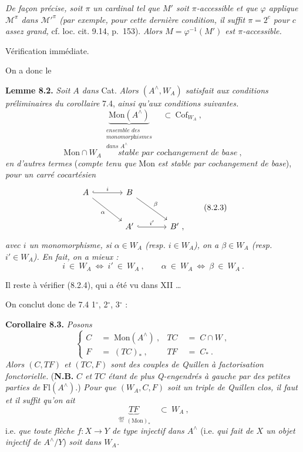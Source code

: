 \documentclass[11pt]{article}
\newcommand{\printedpage}[1]{\marginpar{\footnotesize p.~#1}}
\newcommand{\msp}[1]{\marginpar{\footnotesize [#1]}}
\newcommand{\Mon}{\mathrm{Mon}}
\newcommand{\Fl}{\mathrm{Fl}}
\newcommand{\Cof}{\mathrm{Cof}}
\newcommand{\chap}{^{\wedge}}
\begin{document}
\msp{page 103}
\textit{De façon précise, soit $\pi$ un cardinal tel que $M'$ soit $\pi$-accessible et que $\varphi$ applique $\mathcal{M}^{\pi}$ dans $\mathcal{M}'^{\pi}$ (par exemple, pour cette dernière condition, il suffit $\pi=2^c$ pour $c$ assez grand,} cf. loc. cit. 9.14, p.~153). \textit{Alors $M=\varphi^{-1}(M')$ est $\pi$-accessible.}

Vérification immédiate.

On a donc le

\printedpage{57}
\textbf{Lemme 8.2.} \textit{Soit $A$ dans} Cat. \textit{Alors $(A\chap,W_A)$ satisfait aux conditions préliminaires du corollaire} 7.4, \textit{ainsi qu'aux conditions suivantes.}
\[
\underbrace{\Mon(A\chap)}_{\substack{\textit{ensemble des}\\ \textit{monomorphismes}\\ \textit{dans } A\chap}} \quad\subset\ \Cof_{W_A}\ ,
\tag*{(8.2.1)}
\]
\[
\Mon\cap W_A \qquad \textit{stable par cochangement de base}\ ,
\tag*{(8.2.2)}
\]
\textit{en d'autres termes} (\textit{compte tenu que} Mon \textit{est stable par cochangement de base}), \textit{pour un carré cocartésien}
\[
\begin{tikzcd}[row sep=large, column sep=large]
A \arrow[r, hook, "i"] \arrow[dr, "\alpha"'] & B \arrow[dr, "\beta"] & \\
& A' \arrow[r, hook, "i'"] & B'\ ,
\end{tikzcd}
\tag*{(8.2.3)}
\]
\textit{avec $i$ un monomorphisme, si $\alpha\in W_A$ (resp. $i\in W_A$), on a $\beta\in W_A$ (resp. $i'\in W_A$). En fait, on a mieux :}
\[
i\ \in\ W_A \ \Longleftrightarrow\ i'\ \in\ W_A\ , \qquad \alpha\ \in\ W_A \ \Longleftrightarrow\ \beta\ \in\ W_A\ .
\tag*{(8.2.4)}
\]

\msp{page 104}
Il reste à vérifier (8.2.4), qui a été vu dans XII \ldots

On conclut donc de 7.4 1$^\circ$, 2$^\circ$, 3$^\circ$ :

\textbf{Corollaire 8.3.} \textit{Posons}
\[
\left\{
\begin{aligned}
C \;&=\; \Mon(A\chap)\ , & TC \;&=\; C\cap W\ ,\\
F \;&=\; (TC)_*\ , & TF \;&=\; C_*\ .
\end{aligned}
\right.
\tag*{(8.3.1)}
\]
\textit{Alors $(C,TF)$ et $(TC,F)$ sont des couples de Quillen à factorisation fonctorielle.} (\textbf{N.B.} \textit{$C$ et $TC$ étant de plus Q-engendrés à gauche par des petites parties de} $\Fl(A\chap)$.) \textit{Pour que $(W_A,C,F)$ soit un triple de Quillen clos, il faut et il suffit qu'on ait}
\[
\underbrace{TF}_{\overset{\text{déf}}{=}\,(\Mon)_*} \quad\subset\ W_A\ ,
\tag*{(8.3.2)}
\]
i.e. \textit{que toute flèche $f:X\longrightarrow Y$ de type injectif dans $A\chap$} (i.e. \textit{qui fait de $X$ un objet injectif de $A\chap/Y$}) \textit{soit dans $W_A$.}
\end{document}
